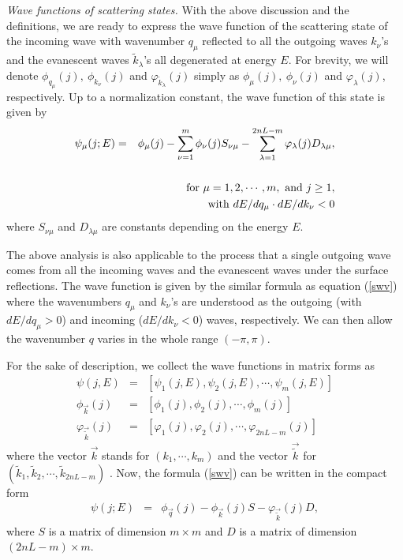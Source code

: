 \documentclass[aps,pra,amsmath,twocolumn,showpacs,bibnotes,10pt]{revtex4-1}
\begin{document}
{\it Wave functions of scattering states.} With the above discussion and the definitions, we are ready to express the wave function of the scattering state of the incoming wave with wavenumber $q_{\mu}$ reflected to all the outgoing waves $k_{\nu}$'s and the evanescent waves $\tilde k_{\lambda}$'s all degenerated at energy $E$. For brevity, we will denote $\phi_{q_{\mu}}(j),~\phi_{k_{\nu}}(j)$ and $\varphi_{\tilde k_{\lambda}}(j)$ simply as $\phi_{\mu}(j),~\phi_{\nu}(j)$ and $\varphi_{\lambda}(j)$, respectively. Up to a normalization constant, the wave function of this state is given by 
\begin{eqnarray}
\psi_{\mu}(j;E) &=& \phi_{\mu}(j)-\sum_{\nu=1}^m\phi_{\nu}(j)S_{\nu\mu}-\sum_{\lambda=1}^{2nL-m}\varphi_{\lambda}(j)D_{\lambda\mu},\nonumber\\
  \label{swv}\\
 &&~~~~{\rm for~} \mu = 1,2,\cdots,m,~{\rm and}~j \geq 1, \nonumber\\
 &&~~~~{\rm with~} dE/dq_{\mu}\cdot dE/dk_{\nu} <0 \nonumber
\end{eqnarray}
where $S_{\nu\mu}$ and $D_{\lambda\mu}$ are constants depending on the energy $E$. 

The above analysis is also applicable to the process that a single outgoing wave comes from all the incoming waves and the evanescent waves under the surface reflections. The wave function is given by the similar formula as equation (\ref{swv}) where the wavenumbers $q_{\mu}$ and $k_{\nu}$'s are understood as the outgoing (with $dE/dq_{\mu} > 0$) and incoming ($dE/dk_{\nu} < 0$) waves, respectively. We can then allow the wavenumber $q$ varies in the whole range $(-\pi,\pi)$.
 
For the sake of description, we collect the wave functions in matrix forms as
\begin{eqnarray}
\psi(j,E) &=& [\psi_1(j,E),\psi_2(j,E),\cdots,\psi_m(j,E)] \nonumber\\
\phi_{\vec k}(j) &=& [\phi_1(j),\phi_2(j),\cdots,\phi_m(j)] \nonumber\\
\varphi_{\vec{\tilde k}}(j) &=& [\varphi_1(j),\varphi_2(j),\cdots,\varphi_{2nL-m}(j)]\nonumber 
\end{eqnarray}
where the vector $\vec k$ stands for $(k_1,\cdots,k_m)$ and the vector $\vec{\tilde k}$ for $(\tilde k_1,\tilde k_2,\cdots,\tilde k_{2nL-m})$ . Now, the formula (\ref{swv}) can be written in the compact form
\begin{eqnarray}
\psi(j;E) &=& \phi_{\vec q}(j)-\phi_{\vec k}(j)S-\varphi_{\vec{\tilde k}}(j)D,   
\label{cwv}
\end{eqnarray}
where $S$ is a matrix of dimension $m\times m$ and $D$ is a matrix of dimension $(2nL-m)\times m$. 
\end{document}
